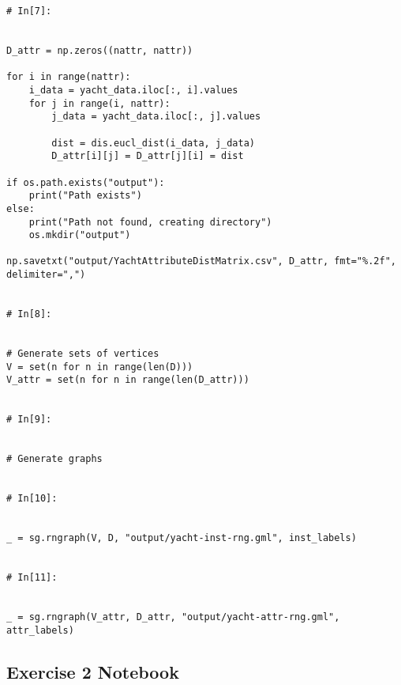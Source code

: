 \documentclass[11pt, a4paper]{article}
\begin{document}
\begin{verbatim}
# In[7]:


D_attr = np.zeros((nattr, nattr))

for i in range(nattr):
    i_data = yacht_data.iloc[:, i].values
    for j in range(i, nattr):
        j_data = yacht_data.iloc[:, j].values
        
        dist = dis.eucl_dist(i_data, j_data)
        D_attr[i][j] = D_attr[j][i] = dist
        
if os.path.exists("output"):
    print("Path exists")
else:
    print("Path not found, creating directory")
    os.mkdir("output")
    
np.savetxt("output/YachtAttributeDistMatrix.csv", D_attr, fmt="%.2f", delimiter=",")    


# In[8]:


# Generate sets of vertices
V = set(n for n in range(len(D)))
V_attr = set(n for n in range(len(D_attr)))


# In[9]:


# Generate graphs


# In[10]:


_ = sg.rngraph(V, D, "output/yacht-inst-rng.gml", inst_labels)


# In[11]:


_ = sg.rngraph(V_attr, D_attr, "output/yacht-attr-rng.gml", attr_labels)
\end{verbatim}

\subsection{Exercise 2 Notebook}
\begin{verbatim}

\end{verbatim}
\end{document}
